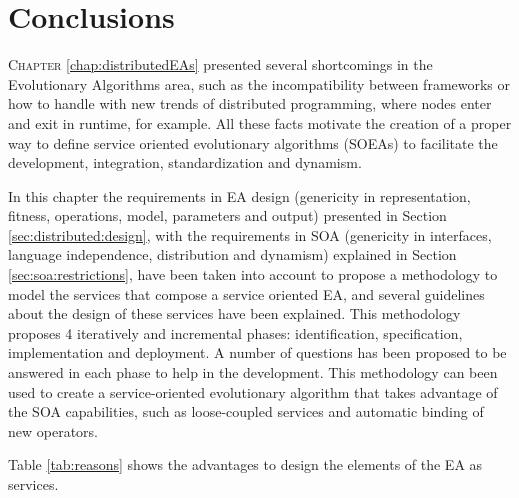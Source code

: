 







\section{Conclusions}

\lettrine{C}{hapter} \ref{chap:distributedEAs} presented several shortcomings in the Evolutionary Algorithms area, such as the  incompatibility between frameworks or how to handle with new trends of distributed programming, where nodes enter and exit in runtime, for example. All these facts  motivate the creation of a proper way to define service oriented evolutionary algorithms (SOEAs) to facilitate the development, integration, standardization and dynamism.

In this chapter the requirements in EA design (genericity in representation, fitness, operations, model, parameters and output) presented  in Section \ref{sec:distributed:design}, with the requirements in SOA (genericity in interfaces, language independence, distribution and dynamism) explained in Section \ref{sec:soa:restrictions}, have been taken into account to propose a methodology to model the services that compose a service oriented EA, and several guidelines about the design of these services have been explained. This methodology proposes 4 iteratively and incremental phases: identification, specification, implementation and deployment. A number of questions has been proposed to be answered in each phase to help in the development. This methodology can been used to create a service-oriented evolutionary algorithm that takes advantage of the SOA capabilities, such as loose-coupled services and automatic binding of new operators. 



Table \ref{tab:reasons} shows the advantages to design the elements of the EA as services.

